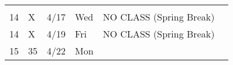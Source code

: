 \begin{longtable}[]{@{}llllll@{}}
\begin{minipage}[t]{0.17\columnwidth}
\strut
\end{minipage}\tabularnewline
\begin{minipage}[t]{0.03\columnwidth}\raggedright
14\strut
\end{minipage} & \begin{minipage}[t]{0.03\columnwidth}\raggedright
X\strut
\end{minipage} & \begin{minipage}[t]{0.06\columnwidth}\raggedright
4/17\strut
\end{minipage} & \begin{minipage}[t]{0.04\columnwidth}\raggedright
Wed\strut
\end{minipage} & \begin{minipage}[t]{0.49\columnwidth}\raggedright
NO CLASS (Spring Break)\strut
\end{minipage} & \begin{minipage}[t]{0.17\columnwidth}\raggedright
\strut
\end{minipage}\tabularnewline
\begin{minipage}[t]{0.03\columnwidth}\raggedright
14\strut
\end{minipage} & \begin{minipage}[t]{0.03\columnwidth}\raggedright
X\strut
\end{minipage} & \begin{minipage}[t]{0.06\columnwidth}\raggedright
4/19\strut
\end{minipage} & \begin{minipage}[t]{0.04\columnwidth}\raggedright
Fri\strut
\end{minipage} & \begin{minipage}[t]{0.49\columnwidth}\raggedright
NO CLASS (Spring Break)\strut
\end{minipage} & \begin{minipage}[t]{0.17\columnwidth}\raggedright
\strut
\end{minipage}\tabularnewline
\begin{minipage}[t]{0.03\columnwidth}\raggedright
15\strut
\end{minipage} & \begin{minipage}[t]{0.03\columnwidth}\raggedright
35\strut
\end{minipage} & \begin{minipage}[t]{0.06\columnwidth}\raggedright
4/22\strut
\end{minipage} & \begin{minipage}[t]{0.04\columnwidth}\raggedright
Mon\strut
\end{minipage} & \begin{minipage}[t]{0.49\columnwidth}\raggedright

\end{minipage}
\end{longtable}
